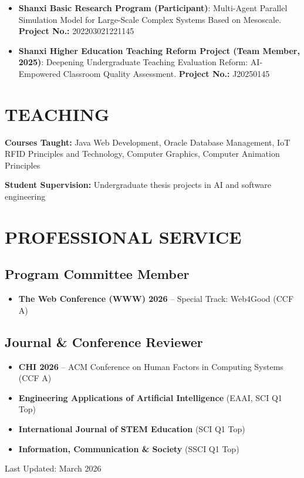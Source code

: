 \documentclass[a4paper,9pt]{extarticle}
\newcommand{\cvlabel}[1]{\textbf{#1}}
\begin{document}
\begin{itemize}[leftmargin=*, topsep=0.2ex, itemsep=0.2ex]
    \item \cvlabel{Shanxi Basic Research Program (Participant)}: Multi-Agent Parallel Simulation Model for Large-Scale Complex Systems Based on Mesoscale. \;\cvlabel{Project No.:} 202203021221145
    \item \cvlabel{Shanxi Higher Education Teaching Reform Project (Team Member, 2025)}: Deepening Undergraduate Teaching Evaluation Reform: AI-Empowered Classroom Quality Assessment. \;\cvlabel{Project No.:} J20250145
\end{itemize}

\section*{TEACHING}

\noindent
\textbf{Courses Taught:} Java Web Development, Oracle Database Management, IoT RFID Principles and Technology, Computer Graphics, Computer Animation Principles

\noindent
\textbf{Student Supervision:} Undergraduate thesis projects in AI and software engineering

\section*{PROFESSIONAL SERVICE}

\subsection*{Program Committee Member}
\begin{itemize}[leftmargin=*]
    \item \textbf{The Web Conference (WWW) 2026} -- Special Track: Web4Good (CCF A)
\end{itemize}

\subsection*{Journal \& Conference Reviewer}
\begin{itemize}[leftmargin=*]
    \item \textbf{CHI 2026} -- ACM Conference on Human Factors in Computing Systems (CCF A)
    \item \textbf{Engineering Applications of Artificial Intelligence} (EAAI, SCI Q1 Top)
    \item \textbf{International Journal of STEM Education} (SCI Q1 Top)
    \item \textbf{Information, Communication \& Society} (SSCI Q1 Top)
\end{itemize}

\vfill
\begin{center}
    \small Last Updated: March 2026
\end{center}
\end{document}
